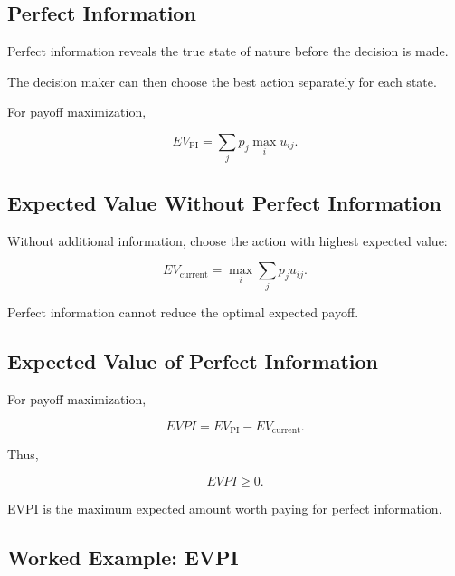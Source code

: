 \subsection{Perfect Information}
\label{subsec:perfect-information-decision}

Perfect information reveals the true state of nature before the decision
is made.

The decision maker can then choose the best action separately for each
state.

For payoff maximization,

\[
\boxed{
EV_{\mathrm{PI}}
=
\sum_j
p_j
\max_i
u_{ij}.
}
\]

\subsection{Expected Value Without Perfect Information}
\label{subsec:expected-value-without-pi}

Without additional information, choose the action with highest expected
value:

\[
\boxed{
EV_{\mathrm{current}}
=
\max_i
\sum_j
p_j
u_{ij}.
}
\]

Perfect information cannot reduce the optimal expected payoff.

\subsection{Expected Value of Perfect Information}
\label{subsec:evpi-decision-theory}

For payoff maximization,

\[
\boxed{
EVPI
=
EV_{\mathrm{PI}}
-
EV_{\mathrm{current}}.
}
\]

Thus,

\[
\boxed{
EVPI\geq0.
}
\]

EVPI is the maximum expected amount worth paying for perfect information.

\subsection{Worked Example: EVPI}
\label{subsec:worked-evpi-decision}

